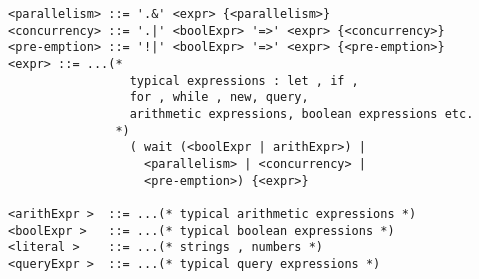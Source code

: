 \begin{lstlisting}[caption = Operators syntax]
<parallelism> ::= '.&' <expr> {<parallelism>}
<concurrency> ::= '.|' <boolExpr> '=>' <expr> {<concurrency>}
<pre-emption> ::= '!|' <boolExpr> '=>' <expr> {<pre-emption>}
<expr> ::= ...(* 
                 typical expressions : let , if , 
                 for , while , new, query, 
                 arithmetic expressions, boolean expressions etc. 
               *)
                 ( wait (<boolExpr | arithExpr>) |
                   <parallelism> | <concurrency> | 
                   <pre-emption>) {<expr>}
            
<arithExpr >  ::= ...(* typical arithmetic expressions *)
<boolExpr >   ::= ...(* typical boolean expressions *)
<literal >    ::= ...(* strings , numbers *)
<queryExpr >  ::= ...(* typical query expressions *)
\end{lstlisting}



